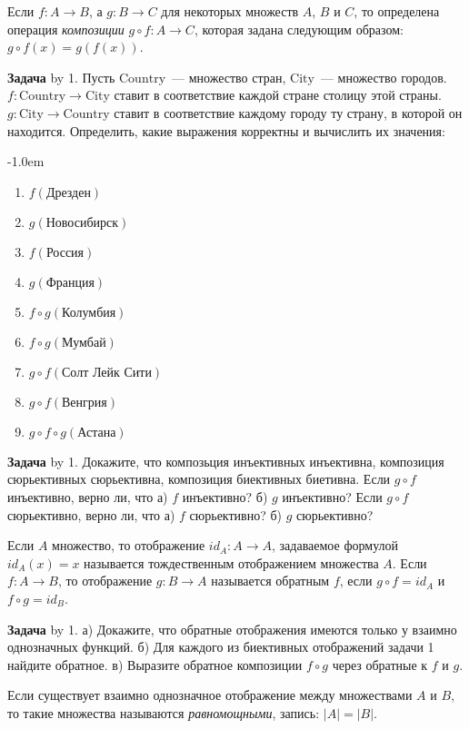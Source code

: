 \documentclass[a4paper,10pt]{article}
\def\problem{\textbf{Задача \the\problemnum}\advance\problemnum by 1}
\begin{document}
Если $f:A\to B$, а $g: B\to C$ для некоторых множеств $A$, $B$ и $C$, то определена операция \textit{композиции} $g\circ f: A\to C$, которая задана следующим образом: $g\circ f(x) = g(f(x))$.

\problem. Пусть $\mathrm{Country}$~--- множество стран, $\mathrm{City}$~--- множество городов. $f:\mathrm{Country}\to\mathrm{City}$ ставит в соответствие каждой стране столицу этой страны. $g:\mathrm{City}\to\mathrm{Country}$ ставит в соответствие каждому городу ту страну, в которой он находится. Определить, какие выражения корректны и вычислить их значения: \par\kern-1.0em
\begin{multicols}{3}
	\begin{enumerate}[label=(\arabic*)\,]
		\item $f(\text{Дрезден})$
		\item $g(\text{Новосибирск})$
		\item $f(\text{Россия})$
		\item $g(\text{Франция})$
		\item $f\circ g(\text{Колумбия})$
		\item $f\circ g(\text{Мумбай})$
		\item $g\circ f(\text{Солт Лейк Сити})$
		\item $g\circ f(\text{Венгрия})$
		\item $g\circ f\circ g(\text{Астана})$
	\end{enumerate}
\end{multicols}
\problem. Докажите, что композьция инъективных инъективна, композиция сюрьективных сюрьективна, композиция биективных биетивна. Если $g\circ f$ инъективно, верно ли, что а) $f$ инъективно? б) $g$ инъективно? Если $g\circ f$ сюрьективно, верно ли, что а) $f$ сюрьективно? б) $g$ сюрьективно?

Если $A$ множество, то отображение $id_A: A\to A$, задаваемое формулой $id_A(x)=x$ называется тождественным отображением множества $A$. Если $f: A\to B$, то отображение $g: B\to A$ называется обратным $f$, если $g\circ f=id_A$ и $f\circ g=id_B$.

\problem. а) Докажите, что обратные отображения имеются только у взаимно однозначных функций. б) Для каждого из биективных отображений задачи 1 найдите обратное. в) Выразите обратное композиции $f\circ g$ через обратные к $f$ и $g$.

Если существует взаимно однозначное отображение между множествами $A$ и $B$, то такие множества называются \textit{равномощными}, запись: $|A|=|B|$.
\end{document}
